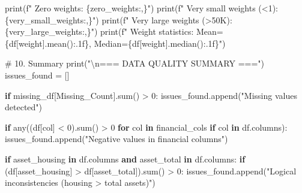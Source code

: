 \documentclass[
  letterpaper,
  DIV=11,
  numbers=noendperiod]{scrartcl}
\newenvironment{Shaded}{\begin{snugshade}}{\end{snugshade}}
\newcommand{\BuiltInTok}[1]{\textcolor[rgb]{0.00,0.23,0.31}{#1}}
\newcommand{\CharTok}[1]{\textcolor[rgb]{0.13,0.47,0.30}{#1}}
\newcommand{\CommentTok}[1]{\textcolor[rgb]{0.37,0.37,0.37}{#1}}
\newcommand{\ControlFlowTok}[1]{\textcolor[rgb]{0.00,0.23,0.31}{\textbf{#1}}}
\newcommand{\DecValTok}[1]{\textcolor[rgb]{0.68,0.00,0.00}{#1}}
\newcommand{\KeywordTok}[1]{\textcolor[rgb]{0.00,0.23,0.31}{\textbf{#1}}}
\newcommand{\NormalTok}[1]{\textcolor[rgb]{0.00,0.23,0.31}{#1}}
\newcommand{\OperatorTok}[1]{\textcolor[rgb]{0.37,0.37,0.37}{#1}}
\newcommand{\SpecialCharTok}[1]{\textcolor[rgb]{0.37,0.37,0.37}{#1}}
\newcommand{\SpecialStringTok}[1]{\textcolor[rgb]{0.13,0.47,0.30}{#1}}
\newcommand{\StringTok}[1]{\textcolor[rgb]{0.13,0.47,0.30}{#1}}
\begin{document}
\begin{Shaded}
\begin{Highlighting}[]
    \BuiltInTok{print}\NormalTok{(}\SpecialStringTok{f"   Zero weights: }\SpecialCharTok{\{}\NormalTok{zero\_weights}\SpecialCharTok{:,\}}\SpecialStringTok{"}\NormalTok{)}
    \BuiltInTok{print}\NormalTok{(}\SpecialStringTok{f"   Very small weights (\textless{}1): }\SpecialCharTok{\{}\NormalTok{very\_small\_weights}\SpecialCharTok{:,\}}\SpecialStringTok{"}\NormalTok{)}
    \BuiltInTok{print}\NormalTok{(}\SpecialStringTok{f"   Very large weights (\textgreater{}50K): }\SpecialCharTok{\{}\NormalTok{very\_large\_weights}\SpecialCharTok{:,\}}\SpecialStringTok{"}\NormalTok{)}
    \BuiltInTok{print}\NormalTok{(}\SpecialStringTok{f"   Weight statistics: Mean=}\SpecialCharTok{\{}\NormalTok{df[}\StringTok{\textquotesingle{}weight\textquotesingle{}}\NormalTok{]}\SpecialCharTok{.}\NormalTok{mean()}\SpecialCharTok{:.1f\}}\SpecialStringTok{, Median=}\SpecialCharTok{\{}\NormalTok{df[}\StringTok{\textquotesingle{}weight\textquotesingle{}}\NormalTok{]}\SpecialCharTok{.}\NormalTok{median()}\SpecialCharTok{:.1f\}}\SpecialStringTok{"}\NormalTok{)}

\CommentTok{\# 10. Summary}
\BuiltInTok{print}\NormalTok{(}\StringTok{"}\CharTok{\textbackslash{}n}\StringTok{=== DATA QUALITY SUMMARY ==="}\NormalTok{)}
\NormalTok{issues\_found }\OperatorTok{=}\NormalTok{ []}

\ControlFlowTok{if}\NormalTok{ missing\_df[}\StringTok{\textquotesingle{}Missing\_Count\textquotesingle{}}\NormalTok{].}\BuiltInTok{sum}\NormalTok{() }\OperatorTok{\textgreater{}} \DecValTok{0}\NormalTok{:}
\NormalTok{    issues\_found.append(}\StringTok{"Missing values detected"}\NormalTok{)}
    
\ControlFlowTok{if} \BuiltInTok{any}\NormalTok{((df[col] }\OperatorTok{\textless{}} \DecValTok{0}\NormalTok{).}\BuiltInTok{sum}\NormalTok{() }\OperatorTok{\textgreater{}} \DecValTok{0} \ControlFlowTok{for}\NormalTok{ col }\KeywordTok{in}\NormalTok{ financial\_cols }\ControlFlowTok{if}\NormalTok{ col }\KeywordTok{in}\NormalTok{ df.columns):}
\NormalTok{    issues\_found.append(}\StringTok{"Negative values in financial columns"}\NormalTok{)}

\ControlFlowTok{if} \StringTok{\textquotesingle{}asset\_housing\textquotesingle{}} \KeywordTok{in}\NormalTok{ df.columns }\KeywordTok{and} \StringTok{\textquotesingle{}asset\_total\textquotesingle{}} \KeywordTok{in}\NormalTok{ df.columns:}
    \ControlFlowTok{if}\NormalTok{ (df[}\StringTok{\textquotesingle{}asset\_housing\textquotesingle{}}\NormalTok{] }\OperatorTok{\textgreater{}}\NormalTok{ df[}\StringTok{\textquotesingle{}asset\_total\textquotesingle{}}\NormalTok{]).}\BuiltInTok{sum}\NormalTok{() }\OperatorTok{\textgreater{}} \DecValTok{0}\NormalTok{:}
\NormalTok{        issues\_found.append(}\StringTok{"Logical inconsistencies (housing \textgreater{} total assets)"}\NormalTok{)}


\end{Highlighting}
\end{Shaded}
\end{document}
